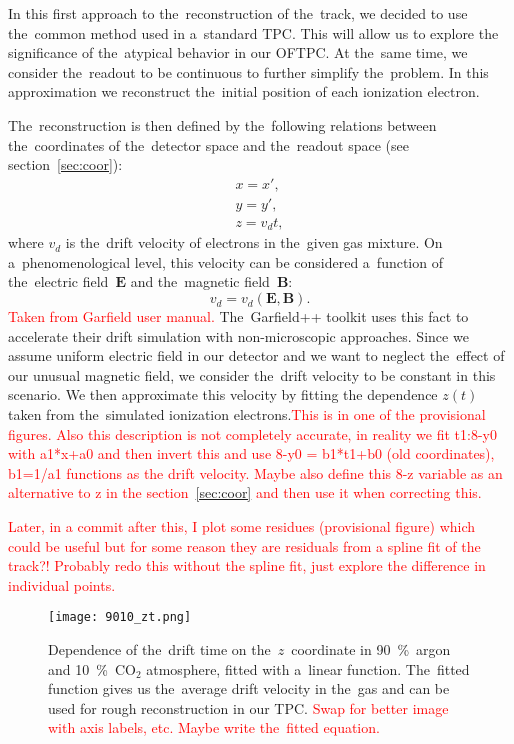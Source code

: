 		In this first approach to the~reconstruction of the~track, we decided to use the~common method used in a~standard \ac{TPC}. This will allow us to explore the significance of the~atypical behavior in our \ac{OFTPC}. At the~same time, we consider the~readout to be continuous to further simplify the~problem. In this approximation we reconstruct the~initial position of each ionization electron.
		
		The~reconstruction is then defined by the~following relations between the~coordinates of the~detector space and the~readout space (see section~\ref{sec:coor}):
			\begin{eqnarray}
				x = x',\\
				y = y',\\
				z = v_d t,
			\end{eqnarray}
		where $v_d$ is the~drift velocity of electrons in the~given gas mixture. On a~phenomenological level, this velocity can be considered a~function of the~electric field~$\bm{E}$ and the~magnetic field~$\bm{B}$:
			\begin{equation}
				v_d = v_d(\bm{E},\bm{B}).
			\end{equation}
		\textcolor{red}{Taken from Garfield user manual.} The~Garfield++ toolkit uses this fact to accelerate their drift simulation with non-microscopic approaches. Since we assume uniform electric field in our detector and we want to neglect the~effect of our unusual magnetic field, we consider the~drift velocity to be constant in this scenario. We then approximate this velocity by fitting the dependence $z(t)$ taken from the~simulated ionization electrons.\textcolor{red}{This is in one of the provisional figures. Also this description is not completely accurate, in reality we fit t1:8-y0 with a1*x+a0 and then invert this and use 8-y0 = b1*t1+b0 (old coordinates), b1=1/a1 functions as the drift velocity. Maybe also define this 8-z variable as an alternative to z in the section~\ref{sec:coor} and then use it when correcting this.}
		
		\textcolor{red}{Later, in a commit after this, I plot some residues (provisional figure) which could be useful but for some reason they are residuals from a spline fit of the track?! Probably redo this without the spline fit, just explore the difference in individual points.}
		
		\begin{figure}
			\centering
			\texttt{[image: 9010\_zt.png]}
			\caption{Dependence of the~drift time on the~$z$~coordinate in 90~\%~argon and 10~\%~CO$_2$ atmosphere, fitted with a~linear function. The~fitted function gives us the~average drift velocity in the~gas and can be used for rough reconstruction in our \ac{TPC}. \textcolor{red}{Swap for better image with axis labels, etc. Maybe write the~fitted equation.}}
			\label{fig:9010zt}
		\end{figure}
		
